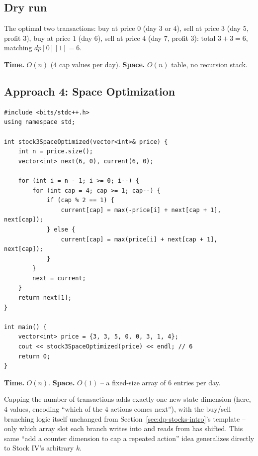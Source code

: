 \subsection*{Dry run}


The optimal two transactions: buy at price $0$ (day $3$ or $4$), sell
at price $3$ (day $5$, profit $3$), buy at price $1$ (day $6$), sell at
price $4$ (day $7$, profit $3$): total $3+3=6$, matching
$\textit{dp}[0][1]=6$.

\begin{complexitybox}
\textbf{Time.} $O(n)$ ($4$ cap values per day).
\textbf{Space.} $O(n)$ table, no recursion stack.
\end{complexitybox}

\subsection*{Approach 4: Space Optimization}

\begin{lstlisting}
#include <bits/stdc++.h>
using namespace std;

int stock3SpaceOptimized(vector<int>& price) {
    int n = price.size();
    vector<int> next(6, 0), current(6, 0);

    for (int i = n - 1; i >= 0; i--) {
        for (int cap = 4; cap >= 1; cap--) {
            if (cap % 2 == 1) {
                current[cap] = max(-price[i] + next[cap + 1], next[cap]);
            } else {
                current[cap] = max(price[i] + next[cap + 1], next[cap]);
            }
        }
        next = current;
    }
    return next[1];
}

int main() {
    vector<int> price = {3, 3, 5, 0, 0, 3, 1, 4};
    cout << stock3SpaceOptimized(price) << endl; // 6
    return 0;
}
\end{lstlisting}

\begin{complexitybox}
\textbf{Time.} $O(n)$.
\textbf{Space.} $O(1)$ -- a fixed-size array of $6$ entries per day.
\end{complexitybox}

\begin{takeawaybox}
Capping the number of transactions adds exactly one new state dimension
(here, $4$ values, encoding ``which of the $4$ actions comes next''),
with the buy/sell branching logic itself unchanged from
Section~\ref{sec:dp-stocks-intro}'s template -- only which array slot
each branch writes into and reads from has shifted. This same
``add a counter dimension to cap a repeated action'' idea generalizes
directly to Stock IV's arbitrary $k$.
\end{takeawaybox}
